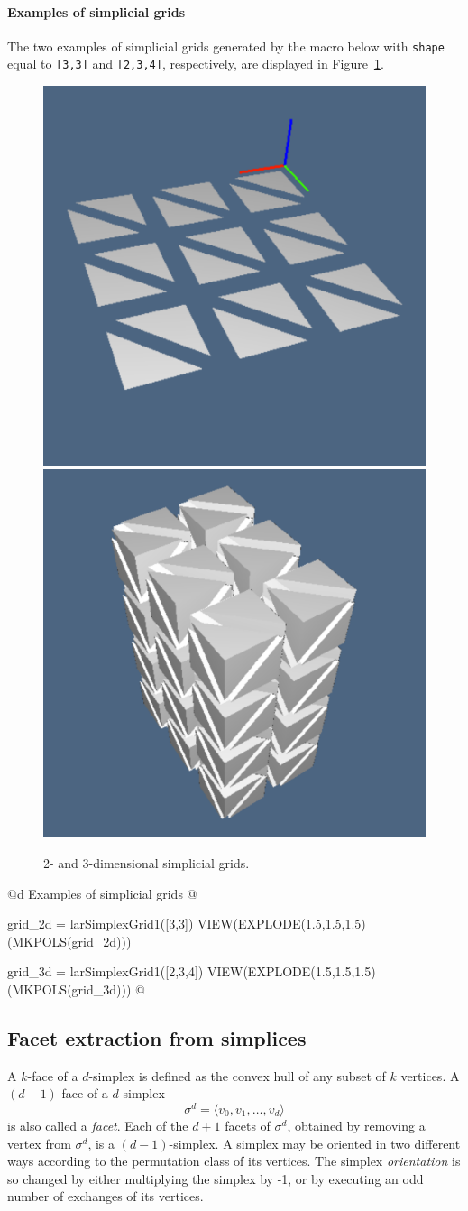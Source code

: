 \documentclass[11pt,oneside]{article}	%
\begin{document}
\paragraph{Examples of simplicial grids} The two examples of simplicial grids generated by the macro below with \texttt{shape} equal to \texttt{[3,3]} and \texttt{[2,3,4]}, respectively, are displayed in Figure~\ref{fig:simplexn-3}.

\begin{figure}[htbp] %
   \centering
   \includegraphics[height=0.25\linewidth,width=0.25\linewidth]{images/simplexn-3a} 
   \includegraphics[height=0.25\linewidth,width=0.25\linewidth]{images/simplexn-3b} 
   \caption{2- and 3-dimensional simplicial grids.}
   \label{fig:simplexn-3}
\end{figure}

@d Examples of simplicial grids
@{grid_2d = larSimplexGrid1([3,3])
VIEW(EXPLODE(1.5,1.5,1.5)(MKPOLS(grid_2d)))

grid_3d = larSimplexGrid1([2,3,4])
VIEW(EXPLODE(1.5,1.5,1.5)(MKPOLS(grid_3d)))
@}


\subsection{Facet extraction from simplices}

A $k$-face of a $d$-simplex is defined as the convex hull of any subset of $k$ vertices.
A $(d-1)$-face of a $d$-simplex 
\[
\sigma^d = \langle v_0, v_1, \ldots, v_d \rangle
\]
 is also called a \emph{facet}. Each of the $d+1$ facets of $\sigma^d$, obtained by removing a vertex from $\sigma^d$, is a $(d-1)$-simplex. A simplex may be oriented in two different ways according to the permutation
class of its vertices. The simplex \emph{orientation} is so changed by either multiplying the simplex by -1, or by executing an odd number of exchanges of its vertices. 
\end{document}

